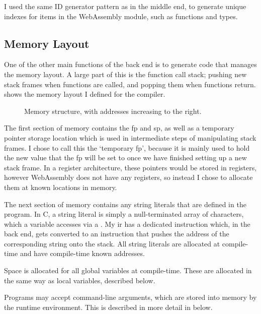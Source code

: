 \documentclass[00-main.tex]{subfiles}
\begin{document}
I used the same ID generator pattern as in the middle end, to generate unique indexes for items in the WebAssembly module, such as functions and types.

\subsection{Memory Layout}

One of the other main functions of the back end is to generate code that manages the memory layout.
A large part of this is the function call stack; pushing new stack frames when functions are called, and popping them when functions return.
 shows the memory layout I defined for the compiler.

\begin{figure}[t]
  \centering
  \caption{Memory structure, with addresses increasing to the right.}
  \label{fig:memory structure} %
\end{figure}

The first section of memory contains the \gls{fp} and \gls{sp}, as well as a temporary pointer storage location which is used in intermediate steps of manipulating stack frames.
I chose to call this the `temporary \gls{fp}', because it is mainly used to hold the new value that the \gls{fp} will be set to once we have finished setting up a new stack frame.
In a register architecture, these pointers would be stored in registers, however WebAssembly does not have any registers, so instead I chose to allocate them at known locations in memory.

The next section of memory contains any string literals that are defined in the program.
In C, a string literal is simply a null-terminated array of characters, which a variable accesses via a .
My \gls{ir} has a dedicated  instruction which, in the back end, gets converted to an instruction that pushes the address of the corresponding string onto the stack.
All string literals are allocated at compile-time and have compile-time known addresses.

Space is allocated for all global variables at compile-time.
These are allocated in the same way as local variables, described below.

Programs may accept command-line arguments, which are stored into memory by the runtime environment.
This is described in more detail in  below.
\end{document}
